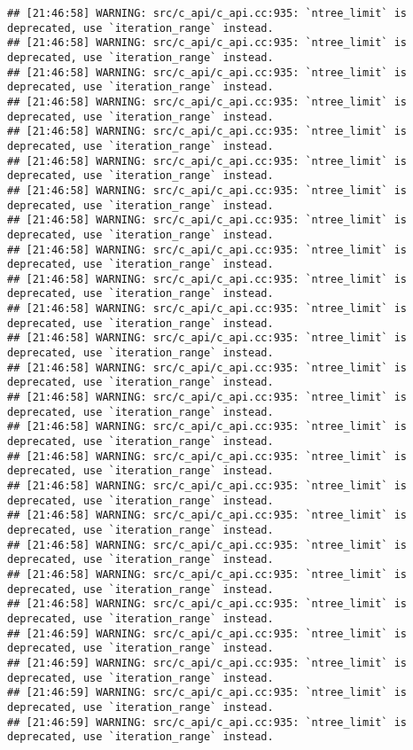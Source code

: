 \documentclass[
]{article}
\begin{document}
\begin{verbatim}
## [21:46:58] WARNING: src/c_api/c_api.cc:935: `ntree_limit` is deprecated, use `iteration_range` instead.
## [21:46:58] WARNING: src/c_api/c_api.cc:935: `ntree_limit` is deprecated, use `iteration_range` instead.
## [21:46:58] WARNING: src/c_api/c_api.cc:935: `ntree_limit` is deprecated, use `iteration_range` instead.
## [21:46:58] WARNING: src/c_api/c_api.cc:935: `ntree_limit` is deprecated, use `iteration_range` instead.
## [21:46:58] WARNING: src/c_api/c_api.cc:935: `ntree_limit` is deprecated, use `iteration_range` instead.
## [21:46:58] WARNING: src/c_api/c_api.cc:935: `ntree_limit` is deprecated, use `iteration_range` instead.
## [21:46:58] WARNING: src/c_api/c_api.cc:935: `ntree_limit` is deprecated, use `iteration_range` instead.
## [21:46:58] WARNING: src/c_api/c_api.cc:935: `ntree_limit` is deprecated, use `iteration_range` instead.
## [21:46:58] WARNING: src/c_api/c_api.cc:935: `ntree_limit` is deprecated, use `iteration_range` instead.
## [21:46:58] WARNING: src/c_api/c_api.cc:935: `ntree_limit` is deprecated, use `iteration_range` instead.
## [21:46:58] WARNING: src/c_api/c_api.cc:935: `ntree_limit` is deprecated, use `iteration_range` instead.
## [21:46:58] WARNING: src/c_api/c_api.cc:935: `ntree_limit` is deprecated, use `iteration_range` instead.
## [21:46:58] WARNING: src/c_api/c_api.cc:935: `ntree_limit` is deprecated, use `iteration_range` instead.
## [21:46:58] WARNING: src/c_api/c_api.cc:935: `ntree_limit` is deprecated, use `iteration_range` instead.
## [21:46:58] WARNING: src/c_api/c_api.cc:935: `ntree_limit` is deprecated, use `iteration_range` instead.
## [21:46:58] WARNING: src/c_api/c_api.cc:935: `ntree_limit` is deprecated, use `iteration_range` instead.
## [21:46:58] WARNING: src/c_api/c_api.cc:935: `ntree_limit` is deprecated, use `iteration_range` instead.
## [21:46:58] WARNING: src/c_api/c_api.cc:935: `ntree_limit` is deprecated, use `iteration_range` instead.
## [21:46:58] WARNING: src/c_api/c_api.cc:935: `ntree_limit` is deprecated, use `iteration_range` instead.
## [21:46:58] WARNING: src/c_api/c_api.cc:935: `ntree_limit` is deprecated, use `iteration_range` instead.
## [21:46:58] WARNING: src/c_api/c_api.cc:935: `ntree_limit` is deprecated, use `iteration_range` instead.
## [21:46:59] WARNING: src/c_api/c_api.cc:935: `ntree_limit` is deprecated, use `iteration_range` instead.
## [21:46:59] WARNING: src/c_api/c_api.cc:935: `ntree_limit` is deprecated, use `iteration_range` instead.
## [21:46:59] WARNING: src/c_api/c_api.cc:935: `ntree_limit` is deprecated, use `iteration_range` instead.
## [21:46:59] WARNING: src/c_api/c_api.cc:935: `ntree_limit` is deprecated, use `iteration_range` instead.

\end{verbatim}
\end{document}
